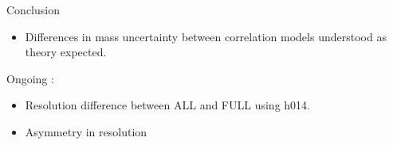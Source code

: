 \documentclass[a4paper]{beamer}
\begin{document}


  
  \begin{frame}{Conclusion}
    \begin{itemize}
    \item Differences in mass uncertainty between correlation models understood as theory expected.
    \end{itemize}
    \vfill
    Ongoing :
    \begin{itemize}
    \item Resolution difference between ALL and FULL using h014.
    \item Asymmetry in resolution 
    \end{itemize}
  \end{frame}
\begin{frame}
\maketitle
\end{frame}
\appendix

\end{document}
